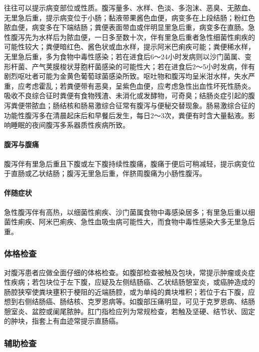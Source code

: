 往往可以提示病变部位或性质。腹泻量多、水样、色淡、多泡沫、恶臭、无脓血、无里急后重，提示病变位于小肠；黏液带果酱色血便，病变多在上段结肠；粉红色脓血便，病变多在下端结肠；粪便表面带血或伴明显里急后重，病变多在直肠。急性腹泻先为水样后为脓血便，一日多至数十次，伴有里急后重者急性细菌性痢疾的可能性较大；粪便暗红色、酱色状或血水样，提示阿米巴痢疾可能；粪便稀水样，无里急后重，多为食物中毒性感染；若在进食后6～24小时发病则以沙门菌属、变形杆菌、产气荚膜梭状芽胞杆菌感染的可能性大；若在进食后2～5小时发病，伴有剧烈呕吐者可能为金黄色葡萄球菌感染所致。呕吐物和腹泻均呈米泔水样，失水严重，应考虑霍乱；若粪便带有恶臭，呈紫色血便，应考虑急性出血性坏死性肠炎。吸收不良综合征时粪便有食物残渣、未消化或发酵物，可奇臭；结肠炎症引起的腹泻粪便带脓血；肠结核和肠易激综合征常有腹泻与便秘交替现象。肠易激综合征的功能性腹泻多在清晨起床后和早餐后发生，每日2～3次，粪便有时含大量黏液。影响睡眠的夜间腹泻多系器质性疾病所致。

\paragraph{腹泻与腹痛}

腹泻伴有里急后重且下腹或左下腹持续性腹痛，腹痛于便后可稍减轻，提示病变位于直肠或乙状结肠；腹泻无里急后重，伴脐周腹痛为小肠性腹泻。

\paragraph{伴随症状}

急性腹泻伴有高热，以细菌性痢疾、沙门菌属食物中毒感染居多；有里急后重以细菌性痢疾、阿米巴痢疾、急性血吸虫病可能性大，而食物中毒性感染大多无里急后重。

\subsubsection{体格检查}

对腹泻患者应做全面仔细的体格检查。如腹部检查被触及包块，常提示肿瘤或炎症性疾病；若包块位于左下腹，应疑及左侧结肠癌、乙状结肠憩室炎，或癌肿造成的肠腔狭窄使粪块壅积于梗阻的近端肠腔，或为单纯的粪块堆积；若位于右下腹，应想到右侧结肠癌、肠结核、克罗恩病等。如腹部压痛明显，可见于克罗恩病、结肠憩室炎、盆腔或阑尾脓肿。肛门指检应列为常规检查，若触及坚硬、结节状、固定的肿块，指套上有血迹常提示直肠癌。

\subsubsection{辅助检查}

